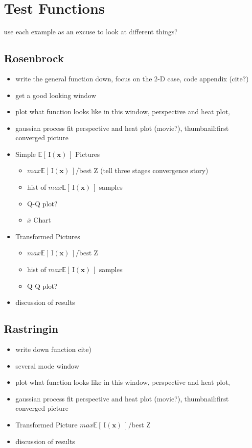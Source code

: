 \documentclass[12pt]{article}
\def \EIx {
	\mathbb{E}\left[~\text{I}(\bm{x})~\right]
}
\begin{document}
\section{Test Functions}
	{\color{red} use each example as an excuse to look at different things?}
	\subsection{Rosenbrock}
		\begin{itemize}
		\item write the general function down, focus on the 2-D case, code appendix ({\color{red}cite?})
		\item get a good looking window
		\item plot what function looks like in this window, perspective and heat plot,
		\item gaussian process fit perspective and heat plot {\color{red}(movie?), thumbnail:first converged picture}%
 		\item Simple $\EIx$ Pictures
 			\begin{itemize}
 			\item $max\EIx$/best Z (tell three stages convergence story)
 			\item hist of $max\EIx$ samples
 			\item {\color{red}Q-Q plot?}
 			\item $\bar{x}$ Chart
 			\end{itemize}
 		\item Transformed Pictures
 			\begin{itemize}
 			\item $max\EIx$/best Z
 			\item hist of $max\EIx$ samples
 			\item {\color{red}Q-Q plot?}
 			\end{itemize}
		\item discussion of results
		\end{itemize}
	\subsection{Rastringin}
		\begin{itemize}
		\item write down function {\color{red} cite)}
		\item several mode window
		\item plot what function looks like in this window, perspective and heat plot,
		\item gaussian process fit perspective and heat plot {\color{red}(movie?), thumbnail:first converged picture}%
		\item Transformed Picture $max\EIx$/best Z
		\item discussion of results
		\end{itemize}
\end{document}

